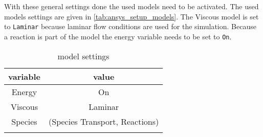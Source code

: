 \documentclass[../thesis.tex]{subfiles}
\begin{document}
With these general settings done the used models need to be activated. The used models settings are given in \autoref{tab:ansys_setup_models}. The Viscous model is set to \texttt{Laminar} because laminar flow conditions are used for the simulation. Because a reaction is part of the model the energy variable needs to be set to \texttt{On}.

\begin{table} [htb]
	\centering
	\caption{model settings}
	\begin{tabular}{ cc }
		\hline
		variable & value \\
		\hline
		Energy & On \\
		Viscous & Laminar \\
		Species & (Species Transport, Reactions)  \\
		\hline
		\label{tab:ansys_setup_models}
	\end{tabular}
\end{table}
\end{document}
